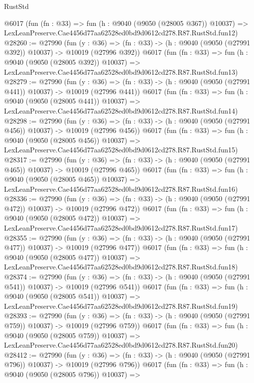 \begin{lexlean}{RustStd}
\begin{coremodule}
{{    @6017
    (fun (fn : @33) =>
    fun (h : @9040 (@9050 (@28005 @367)) @10037) =>
    LexLeanPreserve.Cae4456d77aa62528ed0bd9d0612cd278.R87.RustStd.fun12)
@28260 := @27990
    (fun (y : @36) =>
    (fn : @33) -> (h : @9040 (@9050 (@27991 @392)) @10037) -> @10019 (@27996 @392))
    @6017
    (fun (fn : @33) =>
    fun (h : @9040 (@9050 (@28005 @392)) @10037) =>
    LexLeanPreserve.Cae4456d77aa62528ed0bd9d0612cd278.R87.RustStd.fun13)
@28279 := @27990
    (fun (y : @36) =>
    (fn : @33) -> (h : @9040 (@9050 (@27991 @441)) @10037) -> @10019 (@27996 @441))
    @6017
    (fun (fn : @33) =>
    fun (h : @9040 (@9050 (@28005 @441)) @10037) =>
    LexLeanPreserve.Cae4456d77aa62528ed0bd9d0612cd278.R87.RustStd.fun14)
@28298 := @27990
    (fun (y : @36) =>
    (fn : @33) -> (h : @9040 (@9050 (@27991 @456)) @10037) -> @10019 (@27996 @456))
    @6017
    (fun (fn : @33) =>
    fun (h : @9040 (@9050 (@28005 @456)) @10037) =>
    LexLeanPreserve.Cae4456d77aa62528ed0bd9d0612cd278.R87.RustStd.fun15)
@28317 := @27990
    (fun (y : @36) =>
    (fn : @33) -> (h : @9040 (@9050 (@27991 @465)) @10037) -> @10019 (@27996 @465))
    @6017
    (fun (fn : @33) =>
    fun (h : @9040 (@9050 (@28005 @465)) @10037) =>
    LexLeanPreserve.Cae4456d77aa62528ed0bd9d0612cd278.R87.RustStd.fun16)
@28336 := @27990
    (fun (y : @36) =>
    (fn : @33) -> (h : @9040 (@9050 (@27991 @472)) @10037) -> @10019 (@27996 @472))
    @6017
    (fun (fn : @33) =>
    fun (h : @9040 (@9050 (@28005 @472)) @10037) =>
    LexLeanPreserve.Cae4456d77aa62528ed0bd9d0612cd278.R87.RustStd.fun17)
@28355 := @27990
    (fun (y : @36) =>
    (fn : @33) -> (h : @9040 (@9050 (@27991 @477)) @10037) -> @10019 (@27996 @477))
    @6017
    (fun (fn : @33) =>
    fun (h : @9040 (@9050 (@28005 @477)) @10037) =>
    LexLeanPreserve.Cae4456d77aa62528ed0bd9d0612cd278.R87.RustStd.fun18)
@28374 := @27990
    (fun (y : @36) =>
    (fn : @33) -> (h : @9040 (@9050 (@27991 @541)) @10037) -> @10019 (@27996 @541))
    @6017
    (fun (fn : @33) =>
    fun (h : @9040 (@9050 (@28005 @541)) @10037) =>
    LexLeanPreserve.Cae4456d77aa62528ed0bd9d0612cd278.R87.RustStd.fun19)
@28393 := @27990
    (fun (y : @36) =>
    (fn : @33) -> (h : @9040 (@9050 (@27991 @759)) @10037) -> @10019 (@27996 @759))
    @6017
    (fun (fn : @33) =>
    fun (h : @9040 (@9050 (@28005 @759)) @10037) =>
    LexLeanPreserve.Cae4456d77aa62528ed0bd9d0612cd278.R87.RustStd.fun20)
@28412 := @27990
    (fun (y : @36) =>
    (fn : @33) -> (h : @9040 (@9050 (@27991 @796)) @10037) -> @10019 (@27996 @796))
    @6017
    (fun (fn : @33) =>
    fun (h : @9040 (@9050 (@28005 @796)) @10037) =>
}}
\end{coremodule}
\end{lexlean}
